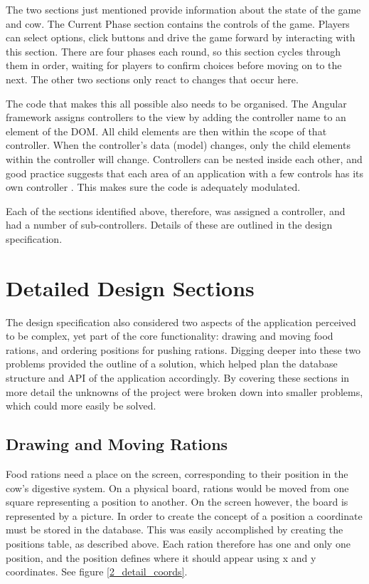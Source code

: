 The two sections just mentioned provide information about the state of the game and cow. The Current Phase section contains the controls of the game. Players can select options, click buttons and drive the game forward by interacting with this section. There are four phases each round, so this section cycles through them in order, waiting for players to confirm choices before moving on to the next. The other two sections only react to changes that occur here.

The code that makes this all possible also needs to be organised. The Angular framework assigns controllers to the view by adding the controller name to an element of the DOM. All child elements are then within the scope of that controller. When the controller's data (model) changes, only the child elements within the controller will change. Controllers can be nested inside each other, and good practice suggests that each area of an application with a few controls has its own controller \cite{Angular}. This makes sure the code is adequately modulated.

Each of the sections identified above, therefore, was assigned a controller, and had a number of sub-controllers. Details of these are outlined in the design specification.

\section{Detailed Design Sections}
The design specification also considered two aspects of the application perceived to be complex, yet part of the core functionality: drawing and moving food rations, and ordering positions for pushing rations. Digging deeper into these two problems provided the outline of a solution, which helped plan the database structure and API of the application accordingly. By covering these sections in more detail the unknowns of the project were broken down into smaller problems, which could more easily be solved.

\subsection{Drawing and Moving Rations}
Food rations need a place on the screen, corresponding to their position in the cow's digestive system. On a physical board, rations would be moved from one square representing a position to another. On the screen however, the board is represented by a picture. In order to create the concept of a position a coordinate must be stored in the database. This was easily accomplished by creating the positions table, as described above. Each ration therefore has one and only one position, and the position defines where it should appear using x and y coordinates. See figure \ref{2_detail_coords}.

